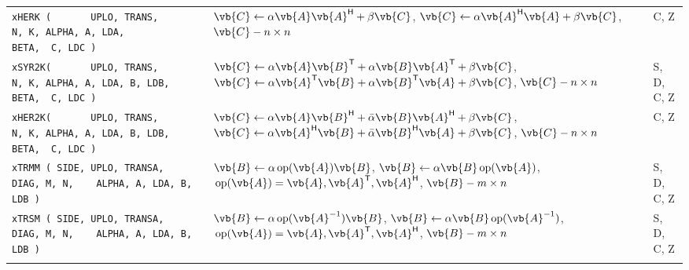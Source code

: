 \documentclass[10pt,a3paper, landscape]{article}
\newcommand{\T}{\mathsf{T}}
\renewcommand{\H}{\mathsf{H}}
\renewcommand{\op}{\,\mathrm{op}}
\begin{document}
\begin{tabular}{lll}
		\verb|xHERK (       UPLO, TRANS,                  N, K, ALPHA, A, LDA,         BETA,  C, LDC ) |                                                                    & $\vb{C} \gets \alpha \vb{A}    \vb{A}^{\H}                               + \beta \vb{C} $, $\vb{C} \gets \alpha  \vb{A}^{\H} \vb{A}                                 + \beta \vb{C} $,                        $\vb{C} - n \times n$                           & C, Z               \\
		\verb|xSYR2K(       UPLO, TRANS,                  N, K, ALPHA, A, LDA, B, LDB, BETA,  C, LDC ) |                                                                    & $\vb{C} \gets \alpha \vb{A}    \vb{B}^{\T}      +       {\alpha} \vb{B} \vb{A}^{\T}   + \beta \vb{C} $, $\vb{C} \gets \alpha \vb{A}^{\T}    \vb{B}      +       {\alpha} \vb{B}^{\T} \vb{A}   + \beta \vb{C} $,                        $\vb{C} - n \times n$ & S, D, C, Z         \\
		\verb|xHER2K(       UPLO, TRANS,                  N, K, ALPHA, A, LDA, B, LDB, BETA,  C, LDC ) |                                                                    & $\vb{C} \gets \alpha \vb{A}    \vb{B}^{\H}      +   \bar{\alpha} \vb{B} \vb{A}^{\H}   + \beta \vb{C} $, $\vb{C} \gets \alpha \vb{A}^{\H}    \vb{B}      +   \bar{\alpha} \vb{B}^{\H} \vb{A}   + \beta \vb{C} $,                        $\vb{C} - n \times n$ & C, Z               \\
		\verb|xTRMM ( SIDE, UPLO, TRANSA,        DIAG, M, N,    ALPHA, A, LDA, B, LDB )                |                                                                    & $\vb{B} \gets \alpha \op(\vb{A})\vb{B}                                           $, $\vb{B} \gets \alpha \vb{B} \op(\vb{A})                                          $, $\op(\vb{A}) = \vb{A}, \vb{A}^{\T}, \vb{A}^{\H}$, $\vb{B} - m \times n$              & S, D, C, Z         \\
		\verb|xTRSM ( SIDE, UPLO, TRANSA,        DIAG, M, N,    ALPHA, A, LDA, B, LDB )                |                                                                    & $\vb{B} \gets \alpha \op(\vb{A}^{-1}) \vb{B}                                     $, $\vb{B} \gets \alpha \vb{B} \op(\vb{A}^{-1})                                     $, $\op(\vb{A}) = \vb{A}, \vb{A}^{\T}, \vb{A}^{\H}$, $\vb{B} - m \times n$              & S, D, C, Z         \\
		                                                                                                                                                                    &                                                                                                                                                                                                                                                              &                    \\

\end{tabular}
\end{document}
